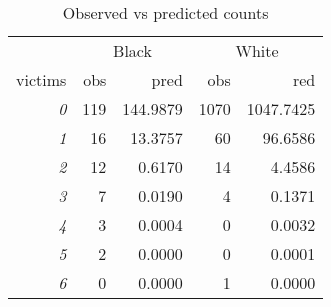 \begin{table}[!h]

\caption{\label{tab:obs_vs_pred}Observed vs predicted counts}
\centering
\fontsize{9}{11}\selectfont
\begin{tabular}[t]{>{}rrrrr}
\toprule
\multicolumn{1}{c}{ } & \multicolumn{2}{c}{Black} & \multicolumn{2}{c}{White} \\
\cmidrule(l{3pt}r{3pt}){2-3} \cmidrule(l{3pt}r{3pt}){4-5}
victims & obs & pred & obs & red\\
\midrule
\em{0} & 119 & 144.9879 & 1070 & 1047.7425\\
\em{1} & 16 & 13.3757 & 60 & 96.6586\\
\em{2} & 12 & 0.6170 & 14 & 4.4586\\
\em{3} & 7 & 0.0190 & 4 & 0.1371\\
\em{4} & 3 & 0.0004 & 0 & 0.0032\\
\addlinespace
\em{5} & 2 & 0.0000 & 0 & 0.0001\\
\em{6} & 0 & 0.0000 & 1 & 0.0000\\
\bottomrule
\end{tabular}
\end{table}
